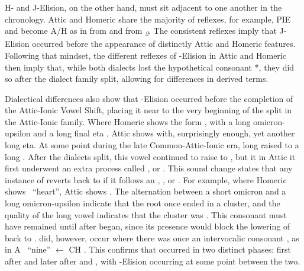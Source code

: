 H- and J-Elision, on the other hand, must sit adjacent to one another in the chronology. Attic and Homeric share the majority of reflexes,\autocite[198]{Smyth_2013} for example, PIE  and  become A/H  as in  from  and  from \textit{\textsubscript{2}}.\autocite[200]{Smyth_2013} The consistent reflexes imply that J-Elision occurred before the appearance of distinctly Attic and Homeric features. Following that mindset, the different reflexes of \W-Elision in Attic and Homeric then imply that, while both dialects lost the hypothetical consonant *\w, they did so after the dialect family split, allowing for differences in derived terms.

Dialectical differences also show that \W-Elision occurred before the completion of the Attic-Ionic Vowel Shift, placing it near to the very beginning of the split in the Attic-Ionic family. Where Homeric shows the form , with a long omicron-upsilon  and a long final eta , Attic shows  with, surprisingly enough, yet another long eta. At some point during the late Common-Attic-Ionic era, long  raised to a long \hellenic{/*\ae:/}. After the dialects split, this vowel continued to raise to , but it in Attic it first underwent an extra process called , or . This sound change states that any instance of \hellenic{/*\ae:/} reverts back to  if it follows an , , or . For example, where Homeric shows \ ``heart'', Attic shows . The alternation between a short omicron  and a long omicron-upsilon  indicate that the root once ended in a cluster, and the quality of the long vowel indicates that the cluster was . This consonant must have remained until after  began, since its presence would block the lowering of  back to .  did, however, occur where there was once an intervocalic consonant \hellenic{*\w}, as in A \ ``nine'' $\gets$ CH .\autocite[ἐννέα]{Beekes_2009} This confirms that  occurred in two distinct phases: first after  and later after  and , with \W-Elision occurring at some point between the two.

